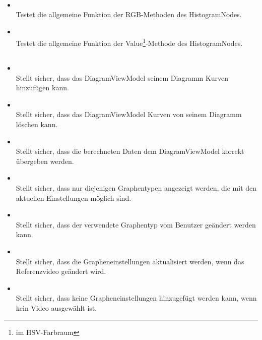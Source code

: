 \paragraph{}
\begin{itemize}
	\item{} \\
		Testet die allgemeine Funktion der RGB-Methoden des HistogramNodes.
	
	\item{} \\
		Testet die allgemeine Funktion der Value\footnote{im HSV-Farbraum}-Methode des HistogramNodes.
\end{itemize}

\subsection{}

\paragraph{}
\begin{itemize}
	\item{} \\
		Stellt sicher, dass das DiagramViewModel seinem Diagramm Kurven hinzufügen kann.
	\item{} \\
		Stellt sicher, dass das DiagramViewModel Kurven von seinem Diagramm löschen kann.
	\item{} \\
		Stellt sicher, dass die berechneten Daten dem DiagramViewModel korrekt übergeben werden.
	\item{} \\
		Stellt sicher, dass nur diejenigen Graphentypen angezeigt werden, die mit den aktuellen Einstellungen möglich sind.
	\item{} \\
		Stellt sicher, dass der verwendete Graphentyp vom Benutzer geändert werden kann.
	\item{} \\
		Stellt sicher, dass die Grapheneinstellungen aktualisiert werden, wenn das Referenzvideo geändert wird.
	\item{} \\
		Stellt sicher, dass keine Grapheneinstellungen hinzugefügt werden kann, wenn kein Video ausgewählt ist.
\end{itemize}


